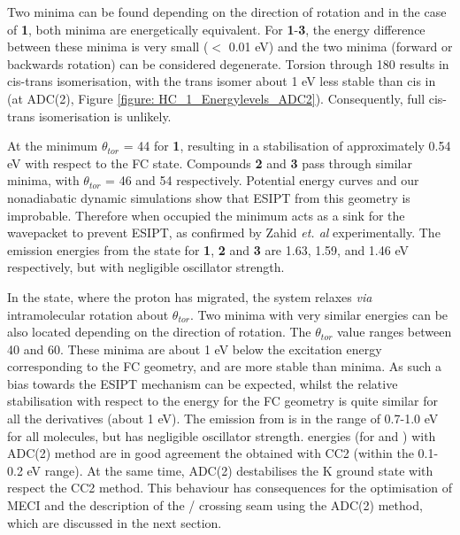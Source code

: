 Two \Estar{} minima can be found depending on the direction of rotation and in the case of \textbf{1}, both minima are energetically equivalent. For \textbf{1}-\textbf{3}, the energy difference between these minima is very small ($<$ 0.01 eV) and the two minima (forward or backwards rotation) can be considered degenerate. Torsion through 180\textdegree{} results in cis-trans isomerisation, with the trans isomer about 1 eV less stable than cis in \sone (at ADC(2), Figure \ref{figure: HC_1_Energylevels_ADC2}). Consequently, full cis-trans isomerisation is unlikely. 

At the \Estar{} minimum  $\theta_{tor}$ = 44\textdegree{} for \textbf{1}, resulting in  a stabilisation of approximately 0.54 eV with respect to the FC state. Compounds \textbf{2} and \textbf{3} pass through similar minima, with $\theta_{tor}$ = 46\textdegree{} and 54\textdegree{} respectively. Potential energy curves and our nonadiabatic dynamic simulations show that ESIPT from this geometry is improbable. Therefore when occupied the \Estar{} minimum acts as a sink for the wavepacket to prevent \ac{ESIPT}, as confirmed by Zahid \textit{et. al} experimentally.\cite{Zahid2017} The emission energies from the \Estar{} state for \textbf{1}, \textbf{2} and \textbf{3} are 1.63, 1.59, and 1.46 eV respectively, but with negligible oscillator strength.

In the \Kstar{} state, where the proton has migrated, the system relaxes \textit{via} intramolecular rotation about $\theta_{tor}$. Two minima with very similar energies can be also located depending on the direction of rotation. The $\theta_{tor}$ value ranges between 40\textdegree{} and 60\textdegree{}. These minima are about 1 eV below the excitation energy corresponding to the FC geometry, and are more stable than \Estar{} minima. As such a bias towards the ESIPT mechanism can be expected, whilst the relative stabilisation with respect to the \sone{} energy for the FC geometry is quite similar for all the derivatives (about 1 eV). The emission from \Kstar{} is in the range of 0.7-1.0 eV for all molecules, but has negligible oscillator strength. \sone{} energies (for \Kstar{} and \Estar) with ADC(2) method are in good agreement the obtained with CC2 (within the 0.1-0.2 eV range). At the same time, ADC(2) destabilises the K ground state with respect the CC2 method. This behaviour has consequences for the optimisation of MECI and the description of the \sone/\szero{} crossing seam using the ADC(2) method, which are discussed in the next section.

